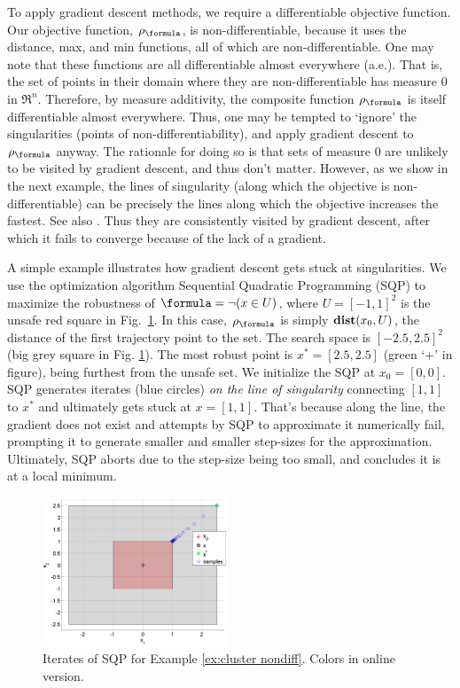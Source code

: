 To apply gradient descent methods, we require a differentiable objective function. 
Our objective function, $\robf$, is non-differentiable, because it uses the distance, max, and min functions, all of which are non-differentiable.
One may note that these functions are all differentiable almost everywhere (a.e.).
That is, the set of points in their domain where they are non-differentiable has measure 0 in $\Re^n$. 
Therefore, by measure additivity, the composite function $\robf$ is itself differentiable almost everywhere.
Thus, one may be tempted to `ignore' the singularities (points of non-differentiability), and apply gradient descent to $\robf$ anyway.
The rationale for doing so is that sets of measure 0 are unlikely to be visited by gradient descent, and thus don't matter. 
However, as we show in the next example, the lines of singularity (along which the objective is non-differentiable) can be  precisely the lines along which the objective increases the fastest.
See also \cite{Cortes08_Discontinuous}.
Thus they are consistently visited by gradient descent, after which it fails to converge because of the lack of a gradient.


\begin{exmp}
	\label{ex:cluster nondiff}
	A simple example illustrates how gradient descent gets stuck at singularities. We use the optimization algorithm Sequential Quadratic Programming (SQP) \cite{Polak97_Optim} to maximize the robustness of $\formula = \neg (x \in U)$, where $U=[-1,1]^2$ is the unsafe red square in Fig.~\ref{fig:DumbExample}.
	In this case, $\robf$ is simply $\mathbf{dist}(x_0,U)$, the distance of the first trajectory point to the set.
	The search space is $[-2.5,2.5]^2$ (big grey square in Fig. \ref{fig:DumbExample}). 
	The most robust point is $x^* = [2.5,2.5]$ (green `+' in figure), being furthest from the unsafe set.
	We initialize the SQP at $x_0=[0,0]$. 
	SQP generates iterates (blue circles) \textit{on the line of singularity} connecting $[1,1]$ to $x^*$ and ultimately gets stuck at $x=[1,1]$.
	That's because along the line, the gradient does not exist and attempts by SQP to approximate it numerically fail, prompting it to generate smaller and smaller step-sizes for the approximation.
	Ultimately, SQP aborts due to the step-size being too small, and concludes it is at a local minimum.
\end{exmp}	
\begin{figure}[t]
\centering
\includegraphics[width=0.49\textwidth]{figures/DumbOptEx_scissored}
\vspace{-20pt}
\caption{{\small Iterates of SQP for Example \ref{ex:cluster nondiff}. Colors in online version.}}
\vspace{-10pt}
\label{fig:DumbExample}
\end{figure}


